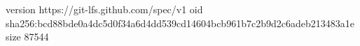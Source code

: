 version https://git-lfs.github.com/spec/v1
oid sha256:bcd88bde0a4dc5d0f34a6d4dd539cd14604bcb961b7c2b9d2c6adeb213483a1e
size 87544
